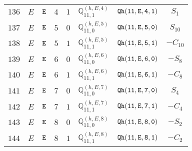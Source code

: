 \documentclass[fleqn,8pt]{jsarticle}
\begin{document}
\begin{table}[ht!]
\begin{center}
\begin{tabular}{cccccccc}
$ 136 $ & $ E $ & $ {\tt E} $ & $ 4 $ & $ 1 $ & $ \mathbb{Q}_{11,1}^{(h,E,4)} $ & $ {\tt Qh(11,E,4,1)} $ & $ S_{1} $ \\
$ 137 $ & $ E $ & $ {\tt E} $ & $ 5 $ & $ 0 $ & $ \mathbb{Q}_{11,0}^{(h,E,5)} $ & $ {\tt Qh(11,E,5,0)} $ & $ S_{10} $ \\
$ 138 $ & $ E $ & $ {\tt E} $ & $ 5 $ & $ 1 $ & $ \mathbb{Q}_{11,1}^{(h,E,5)} $ & $ {\tt Qh(11,E,5,1)} $ & $ - C_{10} $ \\
$ 139 $ & $ E $ & $ {\tt E} $ & $ 6 $ & $ 0 $ & $ \mathbb{Q}_{11,0}^{(h,E,6)} $ & $ {\tt Qh(11,E,6,0)} $ & $ - S_{8} $ \\
$ 140 $ & $ E $ & $ {\tt E} $ & $ 6 $ & $ 1 $ & $ \mathbb{Q}_{11,1}^{(h,E,6)} $ & $ {\tt Qh(11,E,6,1)} $ & $ - C_{8} $ \\
$ 141 $ & $ E $ & $ {\tt E} $ & $ 7 $ & $ 0 $ & $ \mathbb{Q}_{11,0}^{(h,E,7)} $ & $ {\tt Qh(11,E,7,0)} $ & $ S_{4} $ \\
$ 142 $ & $ E $ & $ {\tt E} $ & $ 7 $ & $ 1 $ & $ \mathbb{Q}_{11,1}^{(h,E,7)} $ & $ {\tt Qh(11,E,7,1)} $ & $ - C_{4} $ \\
$ 143 $ & $ E $ & $ {\tt E} $ & $ 8 $ & $ 0 $ & $ \mathbb{Q}_{11,0}^{(h,E,8)} $ & $ {\tt Qh(11,E,8,0)} $ & $ - S_{2} $ \\
$ 144 $ & $ E $ & $ {\tt E} $ & $ 8 $ & $ 1 $ & $ \mathbb{Q}_{11,1}^{(h,E,8)} $ & $ {\tt Qh(11,E,8,1)} $ & $ - C_{2} $ \\
 \hline \hline
\end{tabular}
\end{center}
\end{table}
\end{document}
